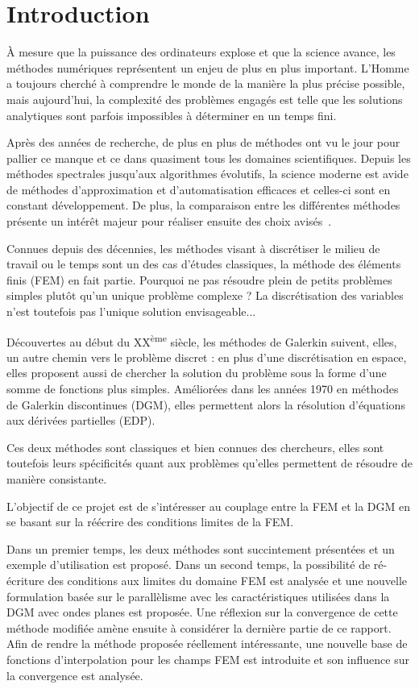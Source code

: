 \section*{Introduction}

À mesure que la puissance des ordinateurs explose et que la science avance, les méthodes numériques représentent un
enjeu de plus en plus important. L'Homme a toujours cherché à comprendre le monde de la manière la plus précise
possible, mais aujourd'hui, la complexité des problèmes engagés est telle que les solutions analytiques sont parfois
impossibles à déterminer en un temps fini.

Après des années de recherche, de plus en plus de méthodes ont vu le jour pour pallier ce manque et ce dans quasiment
tous les domaines scientifiques. Depuis les méthodes spectrales jusqu'aux algorithmes évolutifs, la science moderne est
avide de méthodes d'approximation et d'automatisation efficaces et celles-ci sont en constant développement. De plus,
la comparaison entre les différentes méthodes présente un intérêt majeur pour réaliser ensuite des choix
avisés~\cite{Gabard11}.

Connues depuis des décennies, les méthodes visant à discrétiser le milieu de travail ou le temps sont un des cas
d'études classiques, la méthode des éléments finis (FEM) en fait partie. Pourquoi ne pas résoudre plein de petits problèmes
simples plutôt qu'un unique problème complexe ? La discrétisation des variables n'est toutefois pas l'unique solution
envisageable...

Découvertes au début du XX\textsuperscript{ème} siècle, les méthodes de Galerkin suivent, elles, un autre chemin vers le
problème discret : en plus d'une discrétisation en espace, elles proposent aussi de chercher la solution du problème
sous la forme d'une somme de fonctions plus simples. Améliorées dans les années 1970 en méthodes de Galerkin
discontinues (DGM), elles permettent alors la résolution d'équations aux dérivées partielles (EDP).

Ces deux méthodes sont classiques et bien connues des chercheurs, elles sont toutefois leurs spécificités quant aux
problèmes qu'elles permettent de résoudre de manière consistante.

\bigskip

L'objectif de ce projet est de s'intéresser au couplage entre la FEM et la DGM en se basant sur la réécrire des
conditions limites de la FEM.

Dans un premier temps, les deux méthodes sont succintement présentées et un exemple d'utilisation est proposé.
Dans un second temps, la possibilité de ré-écriture des conditions aux limites du domaine FEM est analysée et une
nouvelle formulation basée sur le parallèlisme avec les caractéristiques utilisées dans la DGM avec ondes planes est
proposée. Une réflexion sur la convergence de cette méthode modifiée amène ensuite à considérer la dernière partie de ce
rapport. Afin de rendre la méthode proposée réellement intéressante, une nouvelle base de fonctions d'interpolation pour
les champs FEM est introduite et son influence sur la convergence est analysée.



